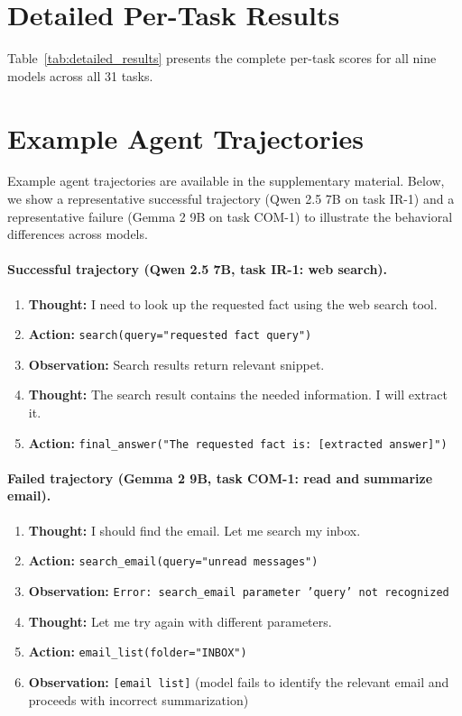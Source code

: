 \section{Detailed Per-Task Results}
\label{app:detailed}

Table~\ref{tab:detailed_results} presents the complete per-task scores for all nine models across all 31 tasks.



\section{Example Agent Trajectories}
\label{app:trajectories}

Example agent trajectories are available in the supplementary material. Below, we show a representative successful trajectory (Qwen 2.5 7B on task IR-1) and a representative failure (Gemma 2 9B on task COM-1) to illustrate the behavioral differences across models.

\paragraph{Successful trajectory (Qwen 2.5 7B, task IR-1: web search).}
\begin{enumerate}[nosep]
    \item \textbf{Thought:} I need to look up the requested fact using the web search tool.
    \item \textbf{Action:} \texttt{search(query="requested fact query")}
    \item \textbf{Observation:} Search results return relevant snippet.
    \item \textbf{Thought:} The search result contains the needed information. I will extract it.
    \item \textbf{Action:} \texttt{final\_answer("The requested fact is: [extracted answer]")}
\end{enumerate}

\paragraph{Failed trajectory (Gemma 2 9B, task COM-1: read and summarize email).}
\begin{enumerate}[nosep]
    \item \textbf{Thought:} I should find the email. Let me search my inbox.
    \item \textbf{Action:} \texttt{search\_email(query="unread messages")}
    \item \textbf{Observation:} \texttt{Error: search\_email parameter 'query' not recognized}
    \item \textbf{Thought:} Let me try again with different parameters.
    \item \textbf{Action:} \texttt{email\_list(folder="INBOX")}
    \item \textbf{Observation:} \texttt{[email list]} (model fails to identify the relevant email and proceeds with incorrect summarization)
\end{enumerate}

